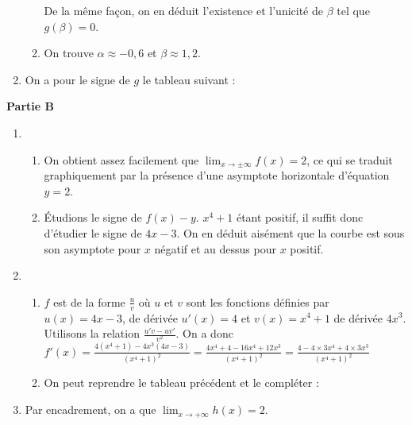 \documentclass[12pt,a4paper,french]{article}
\begin{document}
\begin{solution}
\begin{enumerate}
\begin{enumerate}
De la même façon, on en déduit l'existence et l'unicité de $\beta$ tel que $g(\beta) = 
0$.
\item On trouve $\alpha \approx -0,6$ et $\beta \approx 1,2$.
\end{enumerate}
\item On a pour le signe de $g$ le tableau suivant :
\begin{center}
\end{center}
\end{enumerate}
\textbf{Partie B}
\begin{enumerate}
\item \begin{enumerate}
\item On obtient assez facilement que $\lim_{x\to\pm\infty}f(x) = 2$, ce qui se traduit
graphiquement par la présence d'une asymptote horizontale d'équation $y = 2$.
\item Étudions le signe de $f(x) - y$. $x^4 + 1$ étant positif, il suffit donc d'étudier 
le signe de $4x -3$. On en déduit aisément que la courbe est sous son asymptote pour $x$ 
négatif et au dessus pour $x$ positif.
\end{enumerate}
\item \begin{enumerate}
\item $f$ est de la forme $\frac{u}{v}$ où $u$ et $v$ sont les fonctions définies par 
$u(x) = 4x -3$, de dérivée $u'(x) = 4$ et $v(x)= x^4 + 1$ de dérivée $4x^3$. Utilisons 
la relation $\frac{u'v - uv'}{v^2}$. On a donc $f'(x) = \frac{4(x^4 + 1) - 4x^3(4x 
-3)}{(x^4+1)^2} = \frac{4x^4 + 4 - 16x^4 +12x^3}{(x^4+1)^2} = \frac{4 - 4\times 3x^4 
+4\times 3x^3}{(x^4+1)^2}$
\item On peut reprendre le tableau précédent et le compléter :
\begin{center}
\end{center}
\end{enumerate}
\item Par encadrement, on a que $\lim_{x\to+\infty}h(x) = 2$.
\end{enumerate}
\end{solution}
\end{document}
